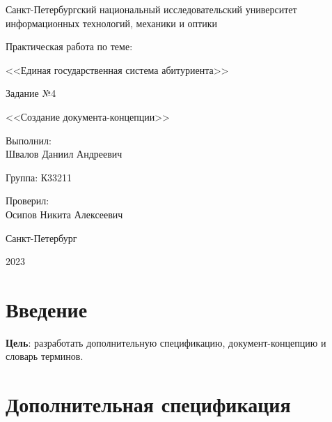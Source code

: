 \documentclass[a4paper, 14pt]{extarticle}
\begin{document}
\begin{titlepage}
  \vspace{0pt plus2fill}
  \noindent

  \vspace{0pt plus6fill}
  \begin{center}
    Санкт-Петербургский национальный исследовательский университет
    информационных технологий, механики и оптики

    \vspace{0pt plus2fill}

    Практическая работа по теме:

    <<Единая государственная система абитуриента>>

    \vspace{0pt plus1fill}

    Задание №4

    <<Создание документа-концепции>>

  \end{center}

  \vspace{0pt plus7fill}
  \begin{flushright}
    Выполнил: \\
    Швалов Даниил Андреевич

    Группа: К33211

    Проверил: \\
    Осипов Никита Алексеевич
  \end{flushright}

  \vspace{0pt plus2fill}
  \begin{center}
    Санкт-Петербург

    2023
  \end{center}
\end{titlepage}

\setcounter{page}{2}

\section{Введение}

\textbf{Цель}: разработать дополнительную спецификацию, документ-концепцию и
словарь терминов.

\newpage

\section{Дополнительная спецификация}
\end{document}
